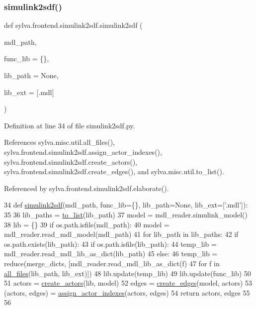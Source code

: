 \subsubsection{\texorpdfstring{simulink2sdf()}{simulink2sdf()}}
{\footnotesize\ttfamily def sylva.\+frontend.\+simulink2sdf.\+simulink2sdf (\begin{DoxyParamCaption}\item[{}]{mdl\+\_\+path,  }\item[{}]{func\+\_\+lib = {\ttfamily \{\}},  }\item[{}]{lib\+\_\+path = {\ttfamily None},  }\item[{}]{lib\+\_\+ext = {\ttfamily \mbox{[}\textquotesingle{}.mdl\textquotesingle{}\mbox{]}} }\end{DoxyParamCaption})}



Definition at line 34 of file simulink2sdf.\+py.



References sylva.\+misc.\+util.\+all\+\_\+files(), sylva.\+frontend.\+simulink2sdf.\+assign\+\_\+actor\+\_\+indexes(), sylva.\+frontend.\+simulink2sdf.\+create\+\_\+actors(), sylva.\+frontend.\+simulink2sdf.\+create\+\_\+edges(), and sylva.\+misc.\+util.\+to\+\_\+list().



Referenced by sylva.\+frontend.\+simulink2sdf.\+elaborate().


\begin{DoxyCode}
34 \textcolor{keyword}{def }\hyperlink{namespacesylva_1_1frontend_1_1simulink2sdf_aa33a1cece85e239778cb65b5d4e62438}{simulink2sdf}(mdl\_path, func\_lib=\{\}, lib\_path=None, lib\_ext=['.mdl']):
35 
36     lib\_paths = \hyperlink{namespacesylva_1_1misc_1_1util_a03f5cfd365a10a5ec0567e320f987a9b}{to\_list}(lib\_path)
37     model = mdl\_reader.simulink\_model()
38     lib = \{\}
39     \textcolor{keywordflow}{if} os.path.isfile(mdl\_path):
40         model = mdl\_reader.read\_mdl\_model(mdl\_path)
41     \textcolor{keywordflow}{for} lib\_path \textcolor{keywordflow}{in} lib\_paths:
42         \textcolor{keywordflow}{if} os.path.exists(lib\_path):
43             \textcolor{keywordflow}{if} os.path.isfile(lib\_path):
44                 temp\_lib = mdl\_reader.read\_mdl\_lib\_as\_dict(lib\_path)
45             \textcolor{keywordflow}{else}:
46                 temp\_lib = reduce(merge\_dicts, [mdl\_reader.read\_mdl\_lib\_as\_dict(f)
47                                                 \textcolor{keywordflow}{for} f \textcolor{keywordflow}{in} \hyperlink{namespacesylva_1_1misc_1_1util_a5dfe1979a130725652883d277a24ee5d}{all\_files}(lib\_path, lib\_ext)])
48             lib.update(temp\_lib)
49     lib.update(func\_lib)
50 
51     actors = \hyperlink{namespacesylva_1_1frontend_1_1simulink2sdf_a67a8c32527e5a89c1ec67fcd17a9da74}{create\_actors}(lib, model)
52     edges = \hyperlink{namespacesylva_1_1frontend_1_1simulink2sdf_a29bf2b8d871f7bcf95cd79761ad8cd85}{create\_edges}(model, actors)
53     (actors, edges) = \hyperlink{namespacesylva_1_1frontend_1_1simulink2sdf_aa4a670a2c40a40dfb700426677bcb657}{assign\_actor\_indexes}(actors, edges)
54     \textcolor{keywordflow}{return} actors, edges
55 
56 
\end{DoxyCode}
